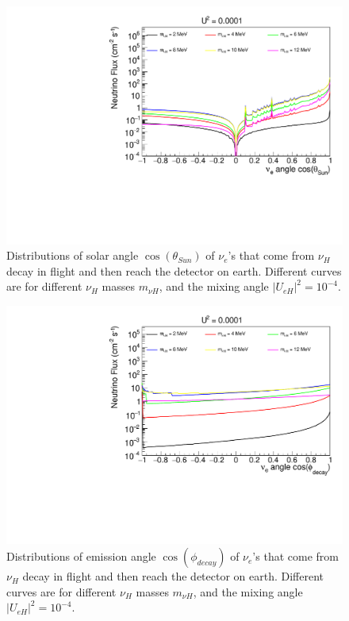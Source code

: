 \documentclass[%
 reprint,
 amsmath,amssymb,
 aps,
 prd,
floatfix,
twocolumn,
]{revtex4-1}
\begin{document}
\begin{figure}[!htbp]
\includegraphics[width=0.99\columnwidth]{../plots/DecayInFlightNuLCosthetaSun_U0.0001_AllMass_linXlogY.pdf}
\caption{Distributions of solar angle $\cos(\theta_{Sun})$ of $\nu_e$'s that come from $\nu_H$ decay in flight and then reach the detector on earth. Different curves are for different $\nu_H$ masses $m_{\nu H}$, and the mixing angle $|U_{eH}|^2 = 10^{-4}$.}
\label{fig:DecayInFlightTheta_U1em4_AllMass}
\end{figure}

\begin{figure}[!htbp]
\includegraphics[width=0.99\columnwidth]{../plots/DecayInFlightNuLCosphiSun_U0.0001_AllMass_linXlogY.pdf}
\caption{Distributions of emission angle $\cos(\phi_{decay})$ of $\nu_e$'s that come from $\nu_H$ decay in flight and then reach the detector on earth. Different curves are for different $\nu_H$ masses $m_{\nu H}$, and the mixing angle $|U_{eH}|^2 = 10^{-4}$.}
\label{fig:DecayInFlightPhi_U1em4_AllMass}
\end{figure}
\end{document}
